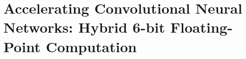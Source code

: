 \chapter{Accelerating Convolutional Neural Networks: Hybrid 6-bit Floating-Point Computation}\label{chap.cnn}
\minitoc

%






